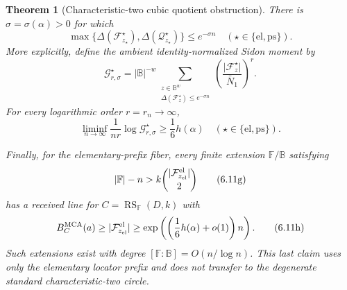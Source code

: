 \documentclass[12pt,a4paper]{amsart}
\numberwithin{equation}{section}
\newtheorem{theorem}{Theorem}[section]
\theoremstyle{remark}
\DeclareMathOperator{\RS}{RS}
\newcommand{\F}{\mathbb F}
\newcommand{\B}{\mathbb B}
\newcommand{\abs}[1]{\lvert #1\rvert}
\begin{document}
\begin{theorem}[Characteristic-two cubic quotient obstruction]
There is \(\sigma=\sigma(\alpha)>0\) for which
\[
 \max\{\Delta(\mathcal F^\star_{z_\star}),
        \Delta(\mathcal Q^\star_{z_\star})\}\le e^{-\sigma n}
 \quad(\star\in\{\mathrm{el},\mathrm{ps}\}).
 \tag{6.11d}\label{eq:binary-cubic-sidon-energy}
\]
More explicitly, define the ambient identity-normalized Sidon moment by
\[
 \mathcal G^\star_{r,\sigma}
 =\abs\B^{-w}
   \sum_{\substack{z\in\B^w\\
          \Delta(\mathcal F^\star_z)\le e^{-\sigma n}}}
   \left(\frac{\abs{\mathcal F^\star_z}}{\bar N_1}\right)^r .
 \tag{6.11e}\label{eq:binary-cubic-sidon-moment-definition}
\]
For every logarithmic order \(r=r_n\to\infty\),
\[
 \liminf_{n\to\infty}\frac1{nr}
       \log\mathcal G^\star_{r,\sigma}
 \ge\frac16h(\alpha)
 \quad(\star\in\{\mathrm{el},\mathrm{ps}\}).
 \tag{6.11f}\label{eq:binary-cubic-sidon-moment}
\]

Finally, for the elementary-prefix fiber, every finite extension
\(\F/\B\) satisfying
\[
 \abs\F-n>k\binom{\abs{\mathcal F^{\rm el}_{z_{\rm el}}}}2
 \tag{6.11g}\label{eq:binary-extension-separation}
\]
has a received line for \(C=\RS_\F(D,k)\) with
\[
 B_C^{\rm MCA}(a)\ge
 \abs{\mathcal F^{\rm el}_{z_{\rm el}}}
 \ge\exp\left(\left(\frac16h(\alpha)+o(1)\right)n\right).
 \tag{6.11h}\label{eq:binary-cubic-mca-obstruction}
\]
Such extensions exist with degree \([\F:\B]=O(n/\log n)\).  This last
claim uses only the elementary locator prefix and does not transfer to
the degenerate standard characteristic-two circle.
\end{theorem}
\end{document}
